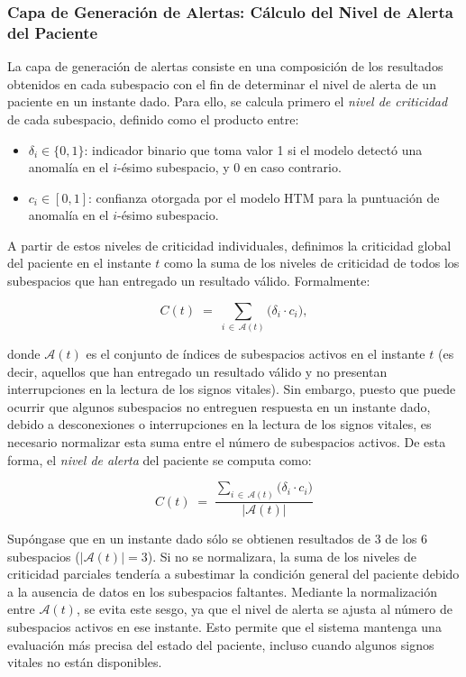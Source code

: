 \subsubsection*{Capa de Generación de Alertas: Cálculo del Nivel de Alerta del Paciente}

La capa de generación de alertas consiste en una composición de los resultados obtenidos en cada subespacio con el fin de determinar el nivel de alerta de un paciente en un instante dado. Para ello, se calcula primero el \emph{nivel de criticidad} de cada subespacio, definido como el producto entre:

\begin{itemize}
  \item $\delta_i \in \{0,1\}$: indicador binario que toma valor 1 si el modelo detectó una anomalía en el $i$-ésimo subespacio, y 0 en caso contrario.
  \item $c_i \in [0,1]$: confianza otorgada por el modelo HTM para la puntuación de anomalía en el $i$-ésimo subespacio.
\end{itemize}

A partir de estos niveles de criticidad individuales, definimos la criticidad global del paciente en el instante $t$ como la suma de los niveles de criticidad de todos los subespacios que han entregado un resultado válido. Formalmente:

\[
  C(t) \;=\; \sum_{i \,\in\, \mathcal{A}(t)} \bigl(\delta_i \cdot c_i \bigr),
\]

donde $\mathcal{A}(t)$ es el conjunto de índices de subespacios activos en el instante $t$ (es decir, aquellos que han entregado un resultado válido y no presentan interrupciones en la lectura de los signos vitales). Sin embargo, puesto que puede ocurrir que algunos subespacios no entreguen respuesta en un instante dado, debido a desconexiones o interrupciones en la lectura de los signos vitales, es necesario normalizar esta suma entre el número de subespacios activos. De esta forma, el \emph{nivel de alerta} del paciente se computa como:

\[
  C(t)
  \;=\;
  \frac{
    \displaystyle\sum_{i \,\in\, \mathcal{A}(t)} \bigl(\delta_i \cdot c_i \bigr)
  }{
    \bigl|\mathcal{A}(t)\bigr|
  }
\]

Supóngase que en un instante dado sólo se obtienen resultados de 3 de los 6 subespacios ($|\mathcal{A}(t)| = 3$). Si no se normalizara, la suma de los niveles de criticidad parciales tendería a subestimar la condición general del paciente debido a la ausencia de datos en los subespacios faltantes. Mediante la normalización entre $\mathcal{A}(t)$, se evita este sesgo, ya que el nivel de alerta se ajusta al número de subespacios activos en ese instante. Esto permite que el sistema mantenga una evaluación más precisa del estado del paciente, incluso cuando algunos signos vitales no están disponibles.

